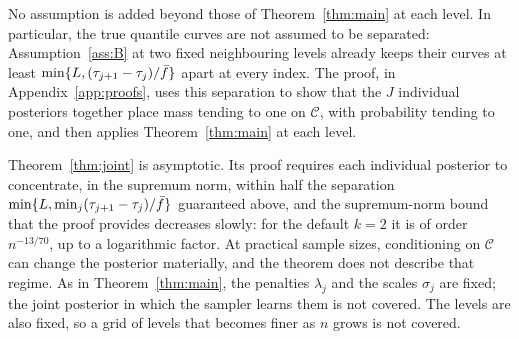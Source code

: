No assumption is added beyond those of Theorem~\ref{thm:main} at each level. In particular, the true quantile curves are not assumed to be separated: Assumption~\ref{ass:B} at two fixed neighbouring levels already keeps their curves at least $\min\{L,(\tau_{j+1}-\tau_j)/\bar f\}$ apart at every index. The proof, in Appendix~\ref{app:proofs}, uses this separation to show that the $J$ individual posteriors together place mass tending to one on $\mathcal C$, with probability tending to one, and then applies Theorem~\ref{thm:main} at each level.

\begin{remark}[Scope]
Theorem~\ref{thm:joint} is asymptotic. Its proof requires each individual posterior to concentrate, in the supremum norm, within half the separation $\min\{L,\min_j(\tau_{j+1}-\tau_j)/\bar f\}$ guaranteed above, and the supremum-norm bound that the proof provides decreases slowly: for the default $k=2$ it is of order $n^{-13/70}$, up to a logarithmic factor. At practical sample sizes, conditioning on $\mathcal C$ can change the posterior materially, and the theorem does not describe that regime. As in Theorem~\ref{thm:main}, the penalties $\lambda_j$ and the scales $\sigma_j$ are fixed; the joint posterior in which the sampler learns them is not covered. The levels are also fixed, so a grid of levels that becomes finer as $n$ grows is not covered.
\end{remark}
